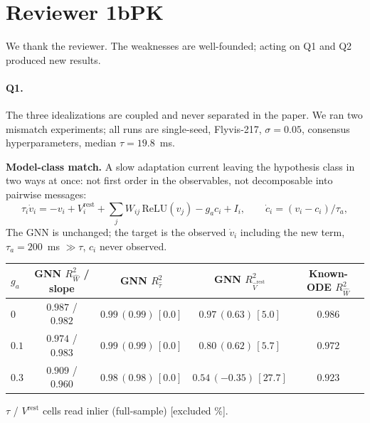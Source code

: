 \documentclass[11pt]{article}
\title{}
\date{}
\author{}
\newcommand{\Rw}{R^2_{\widehat W}}
\newcommand{\Rt}{R^2_{\hat\tau}}
\newcommand{\Rv}{R^2_{\hat V^{\mathrm{rest}}}}
\begin{document}
\maketitle
\vspace{-3.5em}

\section*{Reviewer 1bPK}
We thank the reviewer. The weaknesses are well-founded; acting on Q1 and Q2
produced new results.

\paragraph{Q1.}
The three idealizations are coupled and never separated in the paper. We ran two
mismatch experiments; all runs are single-seed, Flyvis-217, $\sigma = 0.05$,
consensus hyperparameters, median $\tau = 19.8$~ms.

\textbf{Model-class match.} A slow adaptation current leaving the hypothesis class
in two ways at once: not first order in the observables, not decomposable into
pairwise messages:
\[
  \tau_i \dot v_i = -v_i + V^{\mathrm{rest}}_i
  + \sum_j W_{ij}\,\mathrm{ReLU}(v_j) - g_a c_i + I_i ,
  \qquad
  \dot c_i = (v_i - c_i)/\tau_a ,
\]
The GNN is unchanged; the target is the observed $\dot v_i$ including the new
term, $\tau_a = 200$~ms $\gg \tau$, $c_i$ never observed.

\begin{center}
{\footnotesize
\begin{tabular}{lcccc}
\toprule
$g_a$ & GNN $\Rw$ / slope & GNN $\Rt$ & GNN $\Rv$ & Known-ODE $\Rw$ \\
\midrule
$0$   & $0.987$ / $0.982$ & $0.99\,(0.99)\,[0.0]$ & $0.97\,(0.63)\,[5.0]$   & $0.986$ \\
$0.1$ & $0.974$ / $0.983$ & $0.99\,(0.99)\,[0.0]$ & $0.80\,(0.62)\,[5.7]$   & $0.972$ \\
$0.3$ & $0.909$ / $0.960$ & $0.98\,(0.98)\,[0.0]$ & $0.54\,(-0.35)\,[27.7]$ & $0.923$ \\
\bottomrule
\end{tabular}}

{\footnotesize $\tau$ / $V^{\mathrm{rest}}$ cells read inlier (full-sample)
[excluded \%].}
\end{center}
\end{document}
